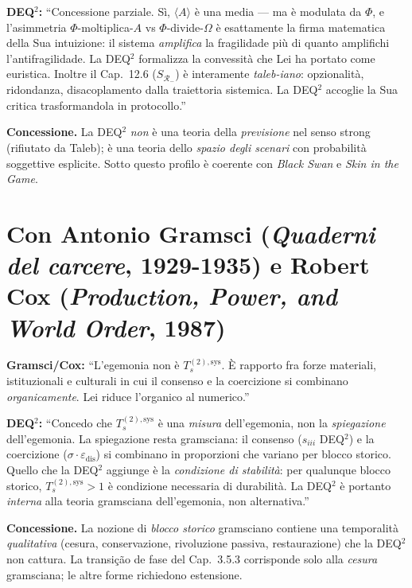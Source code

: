 \textbf{DEQ$^2$:} ``Concessione parziale. Sì, \(\langle A\rangle\) è una
media --- ma è modulata da \(\Phi\), e l'asimmetria
\(\Phi\)-moltiplica-\(A\) vs \(\Phi\)-divide-\(\Omega\) è esattamente la
firma matematica della Sua intuizione: il sistema \emph{amplifica} la
fragilidade più di quanto amplifichi l'antifragilidade. La DEQ$^2$ formalizza
la convessità che Lei ha portato come euristica. Inoltre il Cap.~12.6
(\(S_{\mathcal{R}_-}\)) è interamente \emph{taleb-iano}: opzionalità,
ridondanza, disacoplamento dalla traiettoria sistemica. La DEQ$^2$
accoglie la Sua critica trasformandola in protocollo.''

\textbf{Concessione.} La DEQ$^2$ \emph{non} è una teoria della
\emph{previsione} nel senso strong (rifiutato da Taleb); è una teoria
dello \emph{spazio degli scenari} con probabilità soggettive esplicite.
Sotto questo profilo è coerente con \emph{Black Swan} e \emph{Skin in
the Game}.



\section{\texorpdfstring{Con Antonio Gramsci (\emph{Quaderni del
carcere}, 1929-1935) e Robert Cox (\emph{Production, Power, and World
Order},
1987)}{Con Antonio Gramsci (Quaderni del carcere, 1929-1935) e Robert Cox (Production, Power, and World Order, 1987)}}\label{con-antonio-gramsci-quaderni-del-carcere-1929-1935-e-robert-cox-production-power-and-world-order-1987}

\textbf{Gramsci/Cox:} ``L'egemonia non è \(T_s^{(2),\text{sys}}\). È
rapporto fra forze materiali, istituzionali e culturali in cui il
consenso e la coercizione si combinano \emph{organicamente}. Lei riduce
l'organico al numerico.''

\textbf{DEQ$^2$:} ``Concedo che \(T_s^{(2),\text{sys}}\) è una
\emph{misura} dell'egemonia, non la \emph{spiegazione} dell'egemonia. La
spiegazione resta gramsciana: il consenso (\(s_{iii}\) DEQ$^2$) e la
coercizione (\(\sigma \cdot \varepsilon_{\text{dis}}\)) si combinano in
proporzioni che variano per blocco storico. Quello che la DEQ$^2$ aggiunge
è la \emph{condizione di stabilità}: per qualunque blocco storico,
\(T_s^{(2),\text{sys}} > 1\) è condizione necessaria di durabilità. La
DEQ$^2$ è portanto \emph{interna} alla teoria gramsciana dell'egemonia, non
alternativa.''

\textbf{Concessione.} La nozione di \emph{blocco storico} gramsciano
contiene una temporalità \emph{qualitativa} (cesura, conservazione,
rivoluzione passiva, restaurazione) che la DEQ$^2$ non cattura. La
transição de fase del Cap.~3.5.3 corrisponde solo alla \emph{cesura}
gramsciana; le altre forme richiedono estensione.



